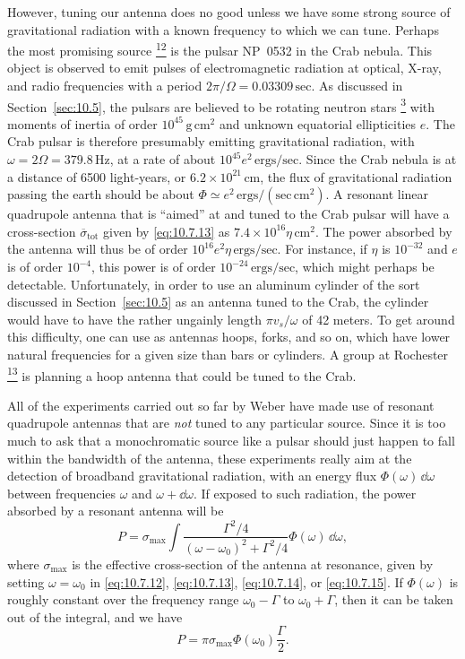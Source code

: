 However, tuning our antenna does no good unless we have some strong source of
gravitational radiation with a known frequency to which we can tune. Perhaps
the most promising source%
\hyperref[ch10-ref-12]{\textsuperscript{12}}
is the pulsar NP~0532 in the Crab nebula. This object is observed to emit
pulses of electromagnetic radiation at optical, X-ray, and radio frequencies
with a period \(2\pi/\Omega=0.03309\,\mathrm{sec}\). As discussed in
Section~\ref{sec:10.5}, the pulsars are believed to be rotating neutron
stars%
\hyperref[ch10-ref-3]{\textsuperscript{3}}
with moments of inertia of order \(10^{45}\,\mathrm{g\,cm^2}\) and unknown
equatorial ellipticities \(e\). The Crab pulsar is therefore presumably
emitting gravitational radiation, with
\(\omega=2\Omega=379.8\,\mathrm{Hz}\), at a rate of about
\(10^{45}e^2\,\mathrm{ergs/sec}\). Since the Crab nebula is at a distance
of 6500 light-years, or \(6.2\times10^{21}\,\mathrm{cm}\), the flux of
gravitational radiation passing the earth should be about
\(\Phi\simeq e^2\,\mathrm{ergs/(sec\,cm^2)}\). A resonant linear quadrupole
antenna that is ``aimed'' at and tuned to the Crab pulsar will have a
cross-section \(\overline{\sigma}_{\mathrm{tot}}\) given by
\eqref{eq:10.7.13} as \(7.4\times10^{16}\eta\,\mathrm{cm^2}\). The power
absorbed by the antenna will thus be of order
\(10^{16}e^2\eta\,\mathrm{ergs/sec}\). For instance, if \(\eta\) is
\(10^{-32}\) and \(e\) is of order \(10^{-4}\), this power is of order
\(10^{-24}\,\mathrm{ergs/sec}\), which might perhaps be detectable.
Unfortunately, in order to use an aluminum cylinder of the sort discussed in
Section~\ref{sec:10.5} as an antenna tuned to the Crab, the cylinder would
have to have the rather ungainly length \(\pi v_s/\omega\) of 42 meters. To
get around this difficulty, one can use as antennas hoops, forks, and so on,
which have lower natural frequencies for a given size than bars or cylinders.
A group at Rochester%
\hyperref[ch10-ref-13]{\textsuperscript{13}}
is planning a hoop antenna that could be tuned to the Crab.

All of the experiments carried out so far by Weber have made use of resonant
quadrupole antennas that are \emph{not} tuned to any particular source. Since
it is too much to ask that a monochromatic source like a pulsar should just
happen to fall within the bandwidth of the antenna, these experiments really
aim at the detection of broadband gravitational radiation, with an energy flux
\(\Phi(\omega)\,\dd\omega\) between frequencies \(\omega\) and
\(\omega+\dd\omega\). If exposed to such radiation, the power absorbed by a
resonant antenna will be
\[
  P
  =
  \sigma_{\max}
  \int
  \frac{\Gamma^2/4}
  {(\omega-\omega_0)^2+\Gamma^2/4}
  \Phi(\omega)\,\dd\omega,
\]
where \(\sigma_{\max}\) is the effective cross-section of the antenna at
resonance, given by setting \(\omega=\omega_0\) in
\eqref{eq:10.7.12}, \eqref{eq:10.7.13}, \eqref{eq:10.7.14}, or
\eqref{eq:10.7.15}. If \(\Phi(\omega)\) is roughly constant over the
frequency range \(\omega_0-\Gamma\) to \(\omega_0+\Gamma\), then it can be
taken out of the integral, and we have
\begin{equation}
  P=\pi\sigma_{\max}\Phi(\omega_0)\frac{\Gamma}{2}.
  \tag{10.7.17}\label{eq:10.7.17}
\end{equation}

